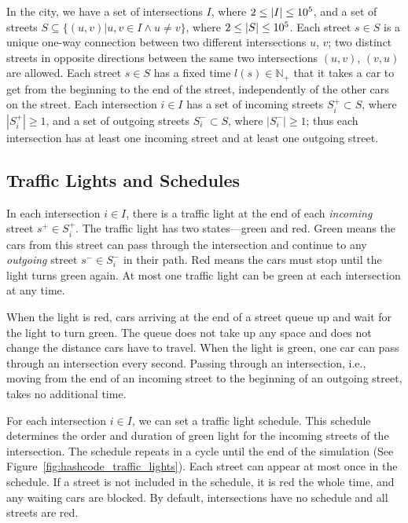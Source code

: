 In the city, we have a set of intersections
$I$, where $2 \leq \left|{I}\right| \leq 10^5$,
and a set of streets
$S \subseteq \{(u, v) | u,v \in I \land u \neq v\}$, where $2 \leq \left|{S}\right| \leq 10^5$.
Each street $s \in S$ is a unique one-way connection between two different intersections $u$, $v$; two distinct streets in opposite directions between the same two intersections $(u, v)$, $(v, u)$ are allowed. Each street $s \in S$ has a fixed time $l(s) \in \mathbb{N}_+$ that it takes a car to get from the beginning to the end of the street, independently of the other cars on the street.
Each intersection $i \in I$ has a set of incoming streets $S_i^+ \subset S$, where $|S_i^+| \geq 1$, and a set of outgoing streets $S_i^- \subset S$, where $|S_i^-| \geq 1$; thus each intersection has at least one incoming street and at least one outgoing street.

\subsection{Traffic Lights and Schedules}

In each intersection $i \in I$, there is a traffic light at the end of each \textit{incoming} street $s^+ \in S_i^+$. The traffic light has two states---green and red. Green means the cars from this street can pass through the intersection and continue to any \textit{outgoing} street $s^- \in S_i^-$ in their path. Red means the cars must stop until the light turns green again. At most one traffic light can be green at each intersection at any time.

When the light is red, cars arriving at the end of a street queue up and wait for the light to turn green. The queue does not take up any space and does not change the distance cars have to travel. When the light is green, one car can pass through an intersection every second. Passing through an intersection, i.e., moving from the end of an incoming street to the beginning of an outgoing street, takes no additional time.

For each intersection $i \in I$, we can set a traffic light schedule. This schedule determines the order and duration of green light for the incoming streets of the intersection. The schedule repeats in a cycle until the end of the simulation (See Figure~\ref{fig:hashcode_traffic_lights}). Each street can appear at most once in the schedule. If a street is not included in the schedule, it is red the whole time, and any waiting cars are blocked. By default, intersections have no schedule and all streets are red.

